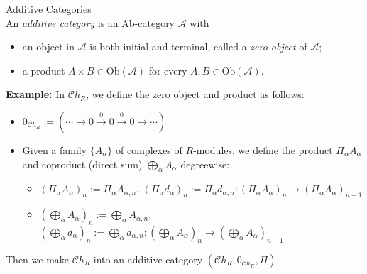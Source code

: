 \begin{definition}{Additive Categories}\\
An \textit{additive category} is an Ab-category $\mathcal{A}$ with 
\begin{itemize}
    \item an object in $\mathcal{A}$ is both initial and terminal, called a \textit{zero object} of $\mathcal{A}$;
    \item a product $A \times B \in \text{Ob} (\mathcal{A})$ for every $A,B \in \text{Ob} (\mathcal{A})$.
\end{itemize}
\end{definition}

\noindent\textbf{Example:} In $\mathcal{C}h_R$, we define the zero object and product as follows:
\begin{itemize}
    \item $0_{\mathcal{C}h_R} := (\cdots \to 0 \xrightarrow{0} 0\xrightarrow{0} 0 \to \cdots)$
    \item Given a family $\{ A_\alpha \}$ of complexes of $R$-modules, we define the product $\Pi_\alpha A_\alpha$ and coproduct (direct sum) $\bigoplus_\alpha A_\alpha$ degreewise:
    \begin{itemize}
        \item $(\Pi_\alpha A_\alpha)_n := \Pi_\alpha A_{\alpha, n}$, $(\Pi_\alpha d_\alpha)_n := \Pi_\alpha d_{\alpha, n} : (\Pi_\alpha A_\alpha)_n \to (\Pi_\alpha A_\alpha)_{n-1}$
        \item $(\bigoplus_{\alpha} A_\alpha)_n := \bigoplus_\alpha A_{\alpha,n}$, $(\bigoplus_\alpha d_\alpha)_n:= \bigoplus_\alpha d_{\alpha,n} : (\bigoplus_{\alpha} A_\alpha)_n \to (\bigoplus_{\alpha} A_\alpha)_{n-1}$
    \end{itemize}
\end{itemize}
Then we make $\mathcal{C}h_R$ into an additive category $(\mathcal{C}h_R, 0_{\mathcal{C}h_R}, \Pi)$.

